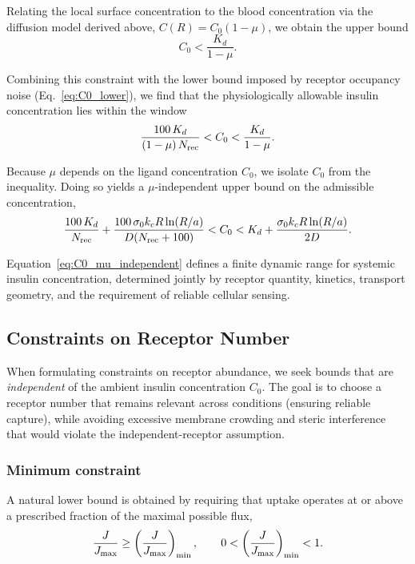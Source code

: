 Relating the local surface concentration to the blood concentration via the diffusion model derived above, $C(R) = C_{0}(1 - \mu)$, we obtain the upper bound
\begin{equation}
    C_{0} < \frac{K_d}{1 - \mu}.
    \label{eq:C0_upper}
\end{equation}

Combining this constraint with the lower bound imposed by receptor occupancy noise (Eq.~\eqref{eq:C0_lower}), we find that the physiologically allowable insulin concentration lies within the window
\begin{equation}
    \frac{100\,K_d}{(1 - \mu)\,N_{\mathrm{rec}}} < C_{0} < \frac{K_d}{1 - \mu}.
    \label{eq:C0_window}
\end{equation}

Because $\mu$ depends on the ligand concentration $C_{0}$, we isolate $C_{0}$ from the inequality.
Doing so yields a $\mu$-independent upper bound on the admissible concentration,
\begin{equation}
    \frac{100\,K_d}{N_{\mathrm{rec}}} + \frac{100\,\sigma_0 k_c R \ln(R/a)}{D(N_{\mathrm{rec}} + 100)} < C_{0} < K_d + \frac{\sigma_0 k_c R \ln(R/a)}{2 D}.
    \label{eq:C0_mu_independent}
\end{equation}

Equation~\eqref{eq:C0_mu_independent} defines a finite dynamic range for systemic insulin concentration, determined jointly by receptor quantity, kinetics, transport geometry, and the requirement of reliable cellular sensing.

\subsection{Constraints on Receptor Number}\label{sec:receptor_constraints}
When formulating constraints on receptor abundance, we seek bounds that are \textit{independent} of the ambient insulin concentration $C_{0}$.
The goal is to choose a receptor number that remains relevant across conditions (ensuring reliable capture), while avoiding excessive membrane crowding and steric interference that would violate the independent-receptor assumption.

\subsubsection{Minimum constraint}\label{sec:min_constraint}
A natural lower bound is obtained by requiring that uptake operates at or above a prescribed fraction of the maximal possible flux,
\begin{equation}
    \frac{J}{J_{\mathrm{max}}} \ge \left(\frac{J}{J_{\mathrm{max}}}\right)_{\min}, \qquad 0 < \left(\frac{J}{J_{\mathrm{max}}}\right)_{\min} < 1.
    \label{eq:flux_min}
\end{equation}

